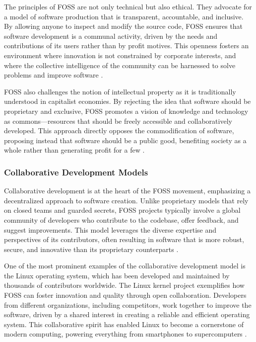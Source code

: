 \begin{refsection}
The principles of FOSS are not only technical but also ethical. They advocate for a model of software production that is transparent, accountable, and inclusive. By allowing anyone to inspect and modify the source code, FOSS ensures that software development is a communal activity, driven by the needs and contributions of its users rather than by profit motives. This openness fosters an environment where innovation is not constrained by corporate interests, and where the collective intelligence of the community can be harnessed to solve problems and improve software \cite[pp.~25-30]{benkler2010}.

FOSS also challenges the notion of intellectual property as it is traditionally understood in capitalist economies. By rejecting the idea that software should be proprietary and exclusive, FOSS promotes a vision of knowledge and technology as commons—resources that should be freely accessible and collaboratively developed. This approach directly opposes the commodification of software, proposing instead that software should be a public good, benefiting society as a whole rather than generating profit for a few \cite[pp.~41-45]{weber2005}.

\subsubsection{Collaborative Development Models}

Collaborative development is at the heart of the FOSS movement, emphasizing a decentralized approach to software creation. Unlike proprietary models that rely on closed teams and guarded secrets, FOSS projects typically involve a global community of developers who contribute to the codebase, offer feedback, and suggest improvements. This model leverages the diverse expertise and perspectives of its contributors, often resulting in software that is more robust, secure, and innovative than its proprietary counterparts \cite[pp.~60-67]{raymond2022}.

One of the most prominent examples of the collaborative development model is the Linux operating system, which has been developed and maintained by thousands of contributors worldwide. The Linux kernel project exemplifies how FOSS can foster innovation and quality through open collaboration. Developers from different organizations, including competitors, work together to improve the software, driven by a shared interest in creating a reliable and efficient operating system. This collaborative spirit has enabled Linux to become a cornerstone of modern computing, powering everything from smartphones to supercomputers \cite[pp.~102-108]{moody2002}.


\end{refsection}
